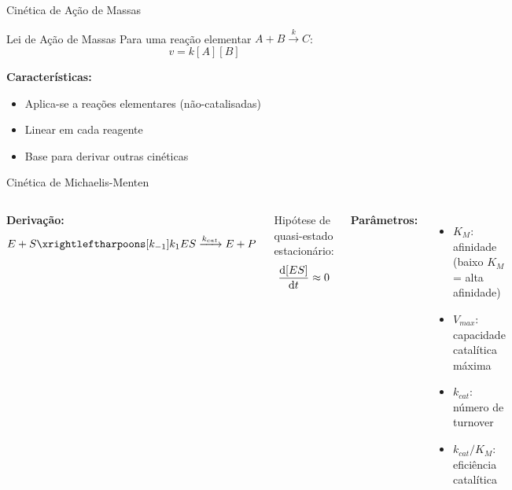 \begin{frame}{Cinética de Ação de Massas}
\begin{block}{Lei de Ação de Massas}
Para uma reação elementar $A + B \xrightarrow{k} C$:
\begin{equation*}
v = k[A][B]
\end{equation*}
\end{block}

\textbf{Características:}
\begin{itemize}
    \item Aplica-se a reações elementares (não-catalisadas)
    \item Linear em cada reagente
    \item Base para derivar outras cinéticas
\end{itemize}

\vspace{0.3cm}

\end{frame}

\begin{frame}{Cinética de Michaelis-Menten}

\vspace{0.3cm}

\begin{columns}
\textbf{Derivação:}
\begin{equation*}
E + S \xrightleftharpoons[k_{-1}]{k_1} ES \xrightarrow{k_{cat}} E + P
\end{equation*}

Hipótese de quasi-estado estacionário:
\begin{equation*}
\frac{\mathrm{d} [ES]}{\mathrm{d} t} \approx 0
\end{equation*}

\textbf{Parâmetros:}
\begin{itemize}
    \item $K_M$: afinidade (baixo $K_M$ = alta afinidade)
    \item $V_{max}$: capacidade catalítica máxima
    \item $k_{cat}$: número de turnover
    \item $k_{cat}/K_M$: eficiência catalítica
\end{itemize}
\end{columns}
\end{frame}

